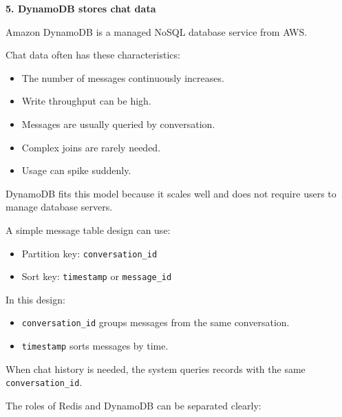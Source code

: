 \vspace{0.5em}\noindent\textbf{5. DynamoDB stores chat
data}\par

Amazon DynamoDB is a managed NoSQL database service from AWS.

Chat data often has these characteristics:

\begin{itemize}
\tightlist
\item
  The number of messages continuously increases.
\item
  Write throughput can be high.
\item
  Messages are usually queried by conversation.
\item
  Complex joins are rarely needed.
\item
  Usage can spike suddenly.
\end{itemize}

DynamoDB fits this model because it scales well and does not require
users to manage database servers.

A simple message table design can use:

\begin{itemize}
\tightlist
\item
  Partition key: \texttt{conversation\_\allowbreak{}id}
\item
  Sort key: \texttt{timestamp} or \texttt{message\_\allowbreak{}id}
\end{itemize}

In this design:

\begin{itemize}
\tightlist
\item
  \texttt{conversation\_\allowbreak{}id} groups messages from the same conversation.
\item
  \texttt{timestamp} sorts messages by time.
\end{itemize}

When chat history is needed, the system queries records with the same
\texttt{conversation\_\allowbreak{}id}.

The roles of Redis and DynamoDB can be separated clearly:

\begin{Shaded}
\begin{Highlighting}[]

\end{Highlighting}
\end{Shaded}

